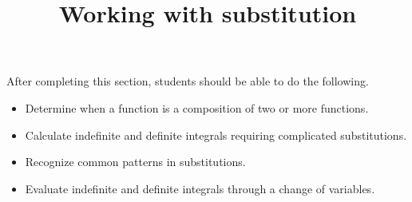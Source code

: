 \documentclass{ximera}
\title{Working with substitution}
\begin{document}
\begin{abstract}
\end{abstract}

\maketitle

\begin{sectionOutcomes}

After completing this section, students should be able to do the following.

\begin{itemize}
	\item Determine when a function is a composition of two or more functions.
	\item Calculate indefinite and definite integrals requiring complicated substitutions.
	\item Recognize common patterns in substitutions.
	\item Evaluate indefinite and definite integrals through a change of variables.
\end{itemize}

\end{sectionOutcomes}
\end{document}
